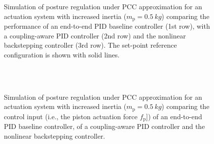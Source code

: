\begin{figure}[ht]
  \caption{Simulation of posture regulation under \gls{PCC} approximation for an actuation system with increased inertia ($m_\mathrm{p} = \SI{0.5}{kg}$) comparing the performance of an end-to-end PID baseline controller (1st row), with a coupling-aware PID controller (2nd row) and the nonlinear backstepping controller (3rd row). The set-point reference configuration is shown with solid lines.}
  \label{fig:backstepping:time_series_plots_m_p-0.5_untuned}
\end{figure}
\begin{figure}[ht]
  \centering
  \\
  \\
  \caption{Simulation of posture regulation under \gls{PCC} approximation for an actuation system with increased inertia ($m_\mathrm{p} = \SI{0.5}{kg}$) comparing the control input (i.e., the piston actuation force $f_\mathrm{p}$]) of an end-to-end PID baseline controller, of a coupling-aware PID controller and the nonlinear backstepping controller.}
  \label{fig:backstepping:time_series_plots_m_p-0.5_untuned_actuation_force}
\end{figure}
